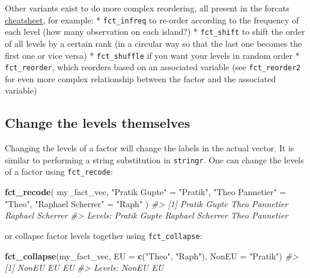 \documentclass[]{book}
\newenvironment{Shaded}{}{}
\newcommand{\CommentTok}[1]{\textcolor[rgb]{0.38,0.63,0.69}{\textit{#1}}}
\newcommand{\DataTypeTok}[1]{\textcolor[rgb]{0.56,0.13,0.00}{#1}}
\newcommand{\KeywordTok}[1]{\textcolor[rgb]{0.00,0.44,0.13}{\textbf{#1}}}
\newcommand{\NormalTok}[1]{#1}
\newcommand{\StringTok}[1]{\textcolor[rgb]{0.25,0.44,0.63}{#1}}
\begin{document}
Other variants exist to do more complex reordering, all present in the forcats \href{https://rstudio.com/resources/cheatsheets/}{cheatsheet}, for example:
* \texttt{fct\_infreq} to re-order according to the frequency of each level (how many observation on each island?)
* \texttt{fct\_shift} to shift the order of all levels by a certain rank (in a circular way so that the last one becomes the first one or vice versa)
* \texttt{fct\_shuffle} if you want your levels in random order
* \texttt{fct\_reorder}, which reorders based on an associated variable (see \texttt{fct\_reorder2} for even more complex relationship between the factor and the associated variable)

\hypertarget{change-the-levels-themselves}{%
\subsection{Change the levels themselves}\label{change-the-levels-themselves}}

Changing the levels of a factor will change the labels in the actual vector. It is similar to performing a string substitution in \texttt{stringr}. One can change the levels of a factor using \texttt{fct\_recode}:

\begin{Shaded}
\begin{Highlighting}[]
\KeywordTok{fct_recode}\NormalTok{(}
\NormalTok{  my_fact_vec,}
  \StringTok{"Pratik Gupte"}\NormalTok{ =}\StringTok{ "Pratik"}\NormalTok{,}
  \StringTok{"Theo Pannetier"}\NormalTok{ =}\StringTok{ "Theo"}\NormalTok{,}
  \StringTok{"Raphael Scherrer"}\NormalTok{ =}\StringTok{ "Raph"}
\NormalTok{)}
\CommentTok{#> [1] Pratik Gupte     Theo Pannetier   Raphael Scherrer}
\CommentTok{#> Levels: Pratik Gupte Raphael Scherrer Theo Pannetier}
\end{Highlighting}
\end{Shaded}

or collapse factor levels together using \texttt{fct\_collapse}:

\begin{Shaded}
\begin{Highlighting}[]
\KeywordTok{fct_collapse}\NormalTok{(my_fact_vec, }\DataTypeTok{EU =} \KeywordTok{c}\NormalTok{(}\StringTok{"Theo"}\NormalTok{, }\StringTok{"Raph"}\NormalTok{), }\DataTypeTok{NonEU =} \StringTok{"Pratik"}\NormalTok{)}
\CommentTok{#> [1] NonEU EU    EU   }
\CommentTok{#> Levels: NonEU EU}
\end{Highlighting}
\end{Shaded}
\end{document}
